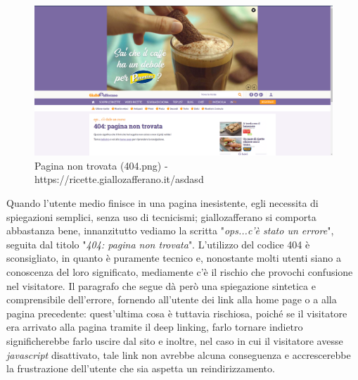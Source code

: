 \begin{figure}[h!]
	\centerline{
	\includegraphics[scale=0.2]{images/404.png}}
	\caption{Pagina non trovata (404.png) - https://ricette.giallozafferano.it/asdasd}
	\label{fig:404}
\end{figure}

Quando l'utente medio finisce in una pagina inesistente, egli necessita di spiegazioni semplici, senza uso di tecnicismi; giallozafferano si comporta abbastanza bene, innanzitutto vediamo la scritta "\textit{ops...c'è stato un errore}", seguita dal titolo "\textit{404: pagina non trovata}". L'utilizzo del codice 404 è sconsigliato, in quanto è puramente tecnico e, nonostante molti utenti siano a conoscenza del loro significato, mediamente c'è il rischio che provochi confusione nel visitatore. Il paragrafo che segue dà però una spiegazione sintetica e comprensibile dell'errore, fornendo all'utente dei link alla home page o a alla pagina precedente: quest'ultima cosa è tuttavia rischiosa, poiché se il visitatore era arrivato alla pagina tramite il deep linking, farlo tornare indietro significherebbe farlo uscire dal sito e inoltre, nel caso in cui il visitatore avesse \textit{javascript} disattivato, tale link non avrebbe alcuna conseguenza e accrescerebbe la frustrazione dell'utente che sia aspetta un reindirizzamento.